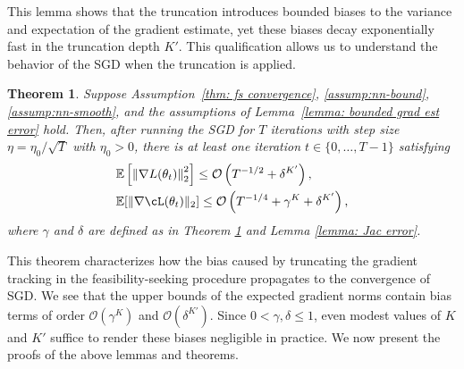 \documentclass{article}
\newcommand{\bigO}{\mathcal{O}}
\newtheorem{theorem}{Theorem}
\begin{document}
This lemma shows that the truncation introduces bounded biases to the variance and expectation of the gradient estimate, yet these biases decay exponentially fast in the truncation depth \(K'\).
This qualification allows us to understand the behavior of the SGD when the truncation is applied.
\begin{theorem}\label{thm: SGD convergence 2}
    Suppose Assumption~\ref{thm: fs convergence}, \ref{assump:nn-bound}, \ref{assump:nn-smooth}, and the assumptions of Lemma~\ref{lemma: bounded grad est error} hold.
    Then, after running the SGD for $T$ iterations with step size $\eta = \eta_0 / \sqrt{T}$ with $\eta_0 > 0$, there is at least one iteration $t \in \{0, \dots, T-1\}$ satisfying 
    \begin{align}%
        &\mathbb{E} \left[ \left\| \nabla L(\theta_t) \right\|^2_2 \right] \leq \bigO\left( T^{-1/2} + \delta^{K'} \right), \\
        &\mathbb{E} [\|\nabla \cL(\theta_t) \|_2] \leq 
        \bigO\left( T^{-1/4} + \gamma^K + \delta^{K'} \right),
    \end{align}
    where $\gamma$ and $\delta$ are defined as in Theorem \ref{thm: SGD convergence 2} and Lemma \ref{lemma: Jac error}.
\end{theorem}

This theorem characterizes how the bias caused by truncating the gradient tracking in the feasibility-seeking procedure propagates to the convergence of SGD. 
We see that the upper bounds of the expected gradient norms contain bias terms of order $\bigO(\gamma^K)$ and $\bigO(\delta^{K'})$. 
Since $0 < \gamma, \delta \leq 1$, even modest values of $K$ and $K'$ suffice to render these biases negligible in practice.
We now present the proofs of the above lemmas and theorems.
\end{document}
